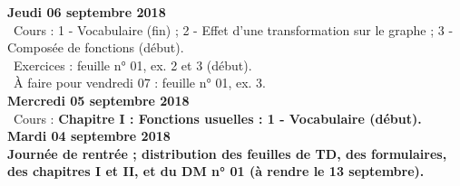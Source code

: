 \documentclass[12pt,a4paper]{article}
\begin{document}
\noindent\textbf{\bf Jeudi 06 septembre 2018}\\
\bu\ Cours : 1 - Vocabulaire (fin) ; 2 - Effet d'une transformation sur le graphe ; 3 - Composée de fonctions (début).\\
\bu\ Exercices : feuille n° 01, ex. 2 et 3 (début).\\
\bu\ À faire pour vendredi 07 : feuille n° 01, ex. 3.\vspace{.4cm}\\
    
\noindent\textbf{\bf Mercredi 05 septembre 2018}\\
\bu\ Cours : \bf Chapitre I \rm : Fonctions usuelles : 1 - Vocabulaire (début).\vspace{.4cm}\\
 
\noindent\textbf{\bf Mardi 04 septembre 2018}\\
Journée de rentrée ; distribution des feuilles de TD, des formulaires, des
chapitres I et II, et du DM n° 01 (à rendre le 13 septembre).\vspace{.4cm}\\


\label{end}
\end{document}
